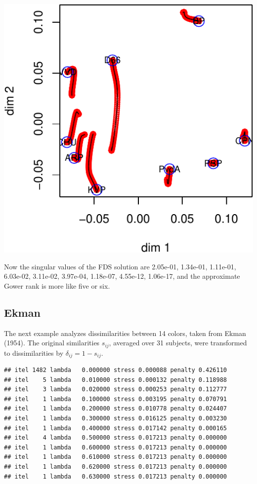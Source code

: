 \documentclass[
  12pt,
]{article}
\begin{document}
\begin{center}\includegraphics{penalty_files/figure-latex/poldist3-1} \end{center}

Now the singular values of the FDS solution are 2.05e-01, 1.34e-01,
1.11e-01, 6.03e-02, 3.11e-02, 3.97e-04, 1.18e-07, 4.55e-12, 1.06e-17,
and the approximate Gower rank is more like five or six.

\hypertarget{ekman}{%
\subsection{Ekman}\label{ekman}}

The next example analyzes dissimilarities between 14 colors, taken from
Ekman (1954). The original similarities \(s_{ij}\), averaged over 31
subjects, were transformed to dissimilarities by
\(\delta_{ij}=1-s_{ij}\).

\begin{verbatim}
## itel 1482 lambda   0.000000 stress 0.000088 penalty 0.426110 
## itel    5 lambda   0.010000 stress 0.000132 penalty 0.118988 
## itel    3 lambda   0.020000 stress 0.000253 penalty 0.112777 
## itel    1 lambda   0.100000 stress 0.003195 penalty 0.070791 
## itel    1 lambda   0.200000 stress 0.010778 penalty 0.024407 
## itel    1 lambda   0.300000 stress 0.016125 penalty 0.003230 
## itel    1 lambda   0.400000 stress 0.017142 penalty 0.000165 
## itel    4 lambda   0.500000 stress 0.017213 penalty 0.000000 
## itel    1 lambda   0.600000 stress 0.017213 penalty 0.000000 
## itel    1 lambda   0.610000 stress 0.017213 penalty 0.000000 
## itel    1 lambda   0.620000 stress 0.017213 penalty 0.000000 
## itel    1 lambda   0.630000 stress 0.017213 penalty 0.000000
\end{verbatim}
\end{document}

